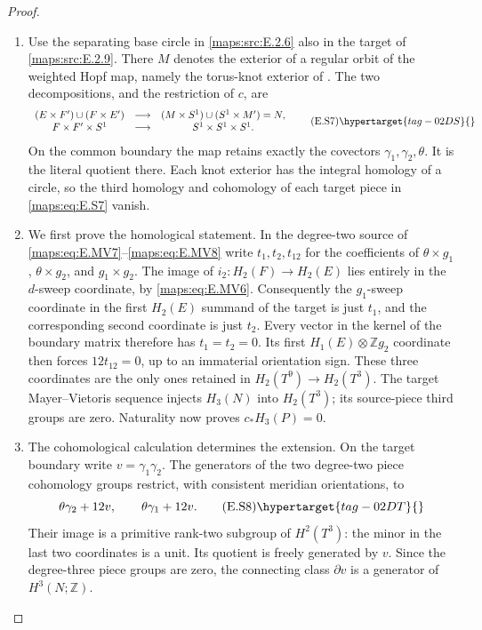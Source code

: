 \begin{proof}
\begin{enumerate}[label={$\langle1\rangle$\arabic*.},leftmargin=*]
\item Use the separating base circle in \ref{maps:src:E.2.6} also in the target of
\ref{maps:src:E.2.9}. There $M$ denotes the exterior of a regular orbit of the
weighted Hopf map, namely the torus-knot exterior of . The
two decompositions, and the restriction of $c$, are
\[
 \begin{array}{ccc}
 (E\times F')\cup(F\times E')&\longrightarrow&
                  (M\times S^1)\cup(S^1\times M')=N,\\
 F\times F'\times S^1&\longrightarrow&S^1\times S^1\times S^1.
 \end{array}
 \tag{E.S7}\hypertarget{tag-02DS}{}\label{maps:eq:E.S7}
\]
On the common boundary the map retains exactly the covectors
$\gamma_1,\gamma_2,\theta$. It is the literal quotient there.
Each knot exterior has the integral homology of a circle, so the
third homology and cohomology of each target piece in \eqref{maps:eq:E.S7} vanish.

\item We first prove the homological statement. In the degree-two source of \eqref{maps:eq:E.MV7}--\eqref{maps:eq:E.MV8}
write $t_1,t_2,t_{12}$ for the coefficients of
$\theta\times g_1$, $\theta\times g_2$, and $g_1\times g_2$.
The image of $i_2:H_2(F)\to H_2(E)$ lies entirely in the
$d$-sweep coordinate, by \eqref{maps:eq:E.MV6}. Consequently the $g_1$-sweep
coordinate in the first $H_2(E)$ summand of the target is just
$t_1$, and the corresponding second coordinate is just $t_2$.
Every vector in the kernel of the boundary matrix therefore has
$t_1=t_2=0$. Its first $H_1(E)\otimes\mathbb Zg_2$ coordinate
then forces $12t_{12}=0$, up to an immaterial orientation sign.
These three coordinates are the only ones retained in
$H_2(T^9)\to H_2(T^3)$. The target Mayer--Vietoris sequence
injects $H_3(N)$ into $H_2(T^3)$; its source-piece third groups
are zero. Naturality now proves $c_*H_3(P)=0$.

\item The cohomological calculation determines the extension. On the target boundary write
$v=\gamma_1\gamma_2$. The generators of the two degree-two
piece cohomology groups restrict, with consistent meridian
orientations, to
\[
       \theta\gamma_2+12v,
       \qquad \theta\gamma_1+12v.
 \tag{E.S8}\hypertarget{tag-02DT}{}\label{maps:eq:E.S8}
\]
Their image is a primitive rank-two subgroup of $H^2(T^3)$:
the minor in the last two coordinates is a unit. Its quotient
is freely generated by $v$. Since the degree-three piece groups
are zero, the connecting class $\partial v$ is a generator of
$H^3(N;\mathbb Z)$.


\end{enumerate}
\end{proof}
